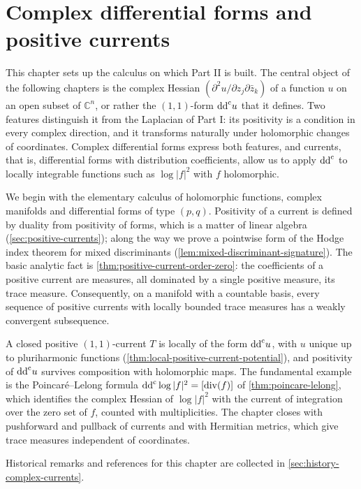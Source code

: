 \chapter{Complex differential forms and positive currents}
\label{chap:complex-currents}

This chapter sets up the calculus on which Part II is built. The central object of the following chapters is the complex Hessian $(\partial^2u/\partial z_j\partial\bar z_k)$ of a function $u$ on an open subset of $\mathbb{C}^n$, or rather the $(1,1)$-form $\mathrm{dd}^{\mathrm{c}} u$ that it defines. Two features distinguish it from the Laplacian of Part I: its positivity is a condition in every complex direction, and it transforms naturally under holomorphic changes of coordinates. Complex differential forms express both features, and currents, that is, differential forms with distribution coefficients, allow us to apply $\mathrm{dd}^{\mathrm{c}}$ to locally integrable functions such as $\log|f|^2$ with $f$ holomorphic.

We begin with the elementary calculus of holomorphic functions, complex manifolds and differential forms of type $(p,q)$. Positivity of a current is defined by duality from positivity of forms, which is a matter of linear algebra (\cref{sec:positive-currents}); along the way we prove a pointwise form of the Hodge index theorem for mixed discriminants (\cref{lem:mixed-discriminant-signature}). The basic analytic fact is \cref{thm:positive-current-order-zero}: the coefficients of a positive current are measures, all dominated by a single positive measure, its trace measure. Consequently, on a manifold with a countable basis, every sequence of positive currents with locally bounded trace measures has a weakly convergent subsequence.

A closed positive $(1,1)$-current $T$ is locally of the form $\mathrm{dd}^{\mathrm{c}} u$, with $u$ unique up to pluriharmonic functions (\cref{thm:local-positive-current-potential}), and positivity of $\mathrm{dd}^{\mathrm{c}} u$ survives composition with holomorphic maps. The fundamental example is the Poincar\'e--Lelong formula $\mathrm{dd}^{\mathrm{c}}\log|f|^2=[\operatorname{div}(f)]$ of \cref{thm:poincare-lelong}, which identifies the complex Hessian of $\log|f|^2$ with the current of integration over the zero set of $f$, counted with multiplicities. The chapter closes with pushforward and pullback of currents and with Hermitian metrics, which give trace measures independent of coordinates.

Historical remarks and references for this chapter are collected in \cref{sec:history-complex-currents}.

